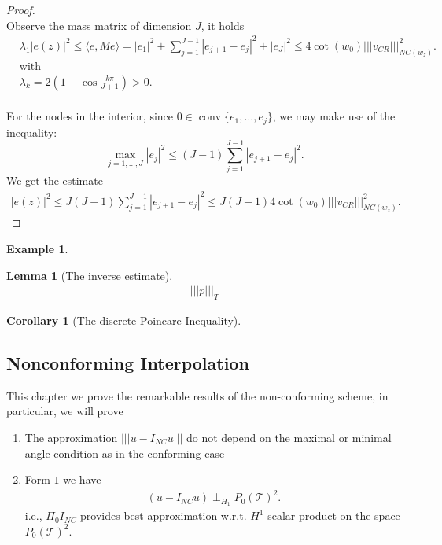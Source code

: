 \documentclass[a4paper,12pt,oneside,fleqn]{book}
\newtheorem{corollary}{Corollary}[theorem]
\newtheorem{lemma}[theorem]{Lemma}
\theoremstyle{definition}
\newtheorem*{example}{Example}
\theoremstyle{remark}
\DeclareMathOperator*{\conv}{conv}
\begin{document}
\begin{proof}
\begin{equation*}
\end{equation*}
Observe the mass matrix of dimension $J$, it holds
\begin{align*}
	&\lambda_1|e(z)|^2 \le \langle e, Me \rangle = |e_1|^2 + \sum_{j = 1}^{J - 1}|e_{j + 1} - e_j|^2 + |e_J|^2 \le 4 \cot(w_0) |||v_{CR}|||_{NC(w_z)}^2.\\
	&\text{with}\\
	&\lambda_k = 2(1 - \cos\frac{k\pi}{J + 1}) > 0. 
\end{align*}
\quad\\
For the nodes in the interior, since $0 \in \conv\{e_1, \dots, e_j\}$, we may make use of the inequality:
\begin{equation}
	\max_{j = 1, \dots, J} |e_j|^2 \le (J - 1)\sum_{j = 1}^{J -1}|e_{j + 1} - e_j|^2 . 
\end{equation}
We get the estimate
\begin{align*}
	|e(z)|^2 \le J (J - 1) \sum_{j = 1}^{J -1}|e_{j + 1} - e_j|^2 \le J ( J - 1) 4\cot(w_0) |||v_{CR}|||_{NC(w_z)}^2 . 
\end{align*}
\end{proof}

\begin{example}	
\end{example}

\begin{lemma}[The inverse estimate]

\begin{align*}
	|||p|||_T 
\end{align*}
\end{lemma}

\begin{corollary}[The discrete Poincare Inequality]
	
\end{corollary}



\subsection{Nonconforming Interpolation}
This chapter we prove the remarkable results of the non-conforming scheme, in particular, we will prove 
\begin{enumerate}
	\item The approximation $||| u - I_{NC}u|||$ do not depend on the maximal or minimal angle condition as in the conforming case
	\item Form $1$ we have
	\begin{align*}
		(  u - I_{NC} u) \perp_{H_1} P_0 (\mathcal{T})^2.
	\end{align*}
	i.e., $\Pi_0 I_{NC}$ provides best approximation w.r.t. $H^1$ scalar product on the space $P_0 (\mathcal{T})^2$.
\end{enumerate}
\end{document}
